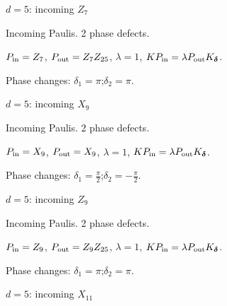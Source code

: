 \vfill
{\footnotesize\texttt{}}
\newpage
{}
{\Large $d=5$: incoming $Z_{7}$}\par
Incoming Paulis. 2 phase defects.
\begin{center}
\end{center}
\vspace{-1mm}
$P_{\rm in}=Z_{7}$, \quad $P_{\rm out}=Z_{7}Z_{25}$, \quad $\lambda=1$, \qquad $K P_{\rm in}=\lambda P_{\rm out}K_{\boldsymbol\delta}$.
\par\smallskip\begin{minipage}{.98\linewidth}\small Phase changes: $\delta_{1}=\pi$;\quad $\delta_{2}=\pi$.\end{minipage}
\vfill
{\footnotesize\texttt{}}
\newpage
{}
{\Large $d=5$: incoming $X_{9}$}\par
Incoming Paulis. 2 phase defects.
\begin{center}
\end{center}
\vspace{-1mm}
$P_{\rm in}=X_{9}$, \quad $P_{\rm out}=X_{9}$, \quad $\lambda=1$, \qquad $K P_{\rm in}=\lambda P_{\rm out}K_{\boldsymbol\delta}$.
\par\smallskip\begin{minipage}{.98\linewidth}\small Phase changes: $\delta_{1}=\frac{\pi}{2}$;\quad $\delta_{2}=-\frac{\pi}{2}$.\end{minipage}
\vfill
{\footnotesize\texttt{}}
\newpage
{}
{\Large $d=5$: incoming $Z_{9}$}\par
Incoming Paulis. 2 phase defects.
\begin{center}
\end{center}
\vspace{-1mm}
$P_{\rm in}=Z_{9}$, \quad $P_{\rm out}=Z_{9}Z_{25}$, \quad $\lambda=1$, \qquad $K P_{\rm in}=\lambda P_{\rm out}K_{\boldsymbol\delta}$.
\par\smallskip\begin{minipage}{.98\linewidth}\small Phase changes: $\delta_{1}=\pi$;\quad $\delta_{2}=\pi$.\end{minipage}
\vfill
{\footnotesize\texttt{}}
\newpage
{}
{\Large $d=5$: incoming $X_{11}$}\par
